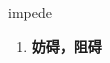 
\begin{frame}
{\huge impede}
\begin{center}
\begin{enumerate}\Large
  \item \textbf{妨碍，阻碍}
\end{enumerate}
\end{center}
\end{frame}

